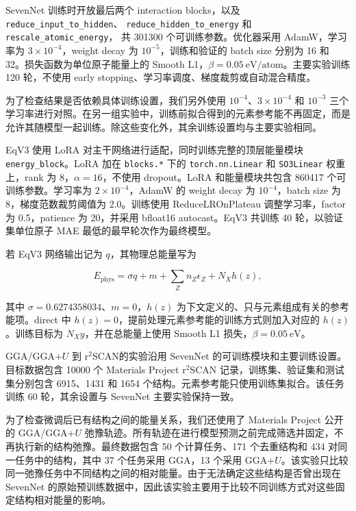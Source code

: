\documentclass[UTF8,a4paper,12pt,fontset=fandol]{ctexart}
\begin{document}
SevenNet 训练时开放最后两个 interaction blocks，以及
\nolinkurl{reduce_input_to_hidden}、
\nolinkurl{reduce_hidden_to_energy} 和
\nolinkurl{rescale_atomic_energy}，
共 301300 个可训练参数。优化器采用 AdamW\cite{loshchilov2017decoupled}，学习率为 \(3\times10^{-4}\)，weight decay 为 \(10^{-5}\)，训练和验证的 batch size 分别为 16 和 32。损失函数为单位原子能量上的 Smooth L1，\(\beta=0.05~\mathrm{eV/atom}\)。主要实验训练 120 轮，不使用 early stopping、学习率调度、梯度裁剪或自动混合精度。

为了检查结果是否依赖具体训练设置，我们另外使用 \(10^{-4}\)、\(3\times10^{-4}\) 和 \(10^{-3}\) 三个学习率进行对照。在另一组实验中，训练前拟合得到的元素参考能不再固定，而是允许其随模型一起训练。除这些变化外，其余训练设置均与主要实验相同。

EqV3 使用 LoRA 对主干网络进行适配\cite{hu2021lora}，同时训练完整的顶层能量模块 \nolinkurl{energy_block}。LoRA 加在 \nolinkurl{blocks.*} 下的 \nolinkurl{torch.nn.Linear} 和 \nolinkurl{SO3Linear} 权重上，rank 为 8，\(\alpha=16\)，不使用 dropout。LoRA 和能量模块共包含 860417 个可训练参数。学习率为 \(2\times10^{-4}\)，AdamW 的 weight decay 为 \(10^{-4}\)，batch size 为 8，梯度范数裁剪阈值为 2.0。训练使用 ReduceLROnPlateau 调整学习率，factor 为 0.5，patience 为 20，并采用 bfloat16 autocast。EqV3 共训练 40 轮，以验证集单位原子 MAE 最低的最早轮次作为最终模型。

若 EqV3 网络输出记为 \(q\)，其物理总能量写为

\[
E_{\mathrm{phys}}
=
\sigma q+m+\sum_Z n_Z\epsilon_Z+N_Xh(z),
\]

其中 \(\sigma=0.6274358034\)、\(m=0\)，\(h(z)\) 为下文定义的、只与元素组成有关的参考能项。direct 中 \(h(z)=0\)，提前处理元素参考能的训练方式则加入对应的 \(h(z)\)。训练目标为 \(N_Xy\)，并在总能量上使用 Smooth L1 损失，\(\beta=0.05~\mathrm{eV}\)。

GGA/GGA+$U$  到 r$^2$SCAN的实验沿用 SevenNet 的可训练模块和主要训练设置。目标数据包含 10000 个 Materials Project r$^2$SCAN 记录，训练集、验证集和测试集分别包含 6915、1431 和 1654 个结构。元素参考能只使用训练集拟合。该任务训练 60 轮，其余设置与 SevenNet 主要实验保持一致。

为了检查微调后已有结构之间的能量关系，我们还使用了 Materials Project 公开的 GGA/GGA+$U$ 弛豫轨迹。所有轨迹在进行模型预测之前完成筛选并固定，不再执行新的结构弛豫。最终数据包含 50 个计算任务、171 个去重结构和 434 对同一任务中的结构，其中 37 个任务采用 GGA，13 个采用 GGA+$U$。该实验只比较同一弛豫任务中不同结构之间的相对能量。由于无法确定这些结构是否曾出现在 SevenNet 的原始预训练数据中，因此该实验主要用于比较不同训练方式对这些固定结构相对能量的影响。
\end{document}
